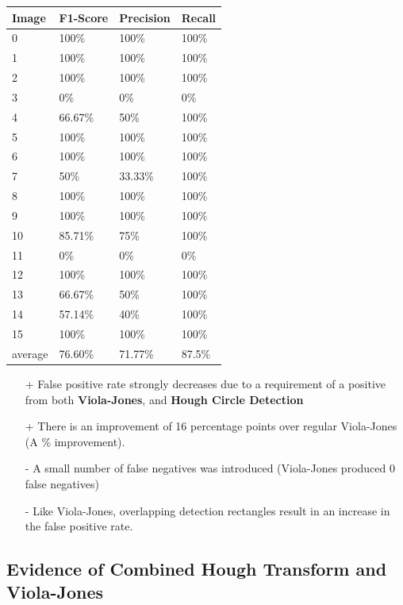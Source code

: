 \documentclass[conference]{IEEEtran}
\begin{document}
\begin{center}
	\begin{tabular}{| l | l | l | l |}
		\hline
		Image & F1-Score & Precision & Recall \\ \hline
		0 & 100\% & 100\% & 100\% \\ \hline
		1 & 100\% & 100\% & 100\% \\ \hline
		2 & 100\% & 100\% & 100\% \\ \hline
		3 &  0\% & 0\% & 0\% \\ \hline
		4 & 66.67\% & 50\% & 100\% \\ \hline
		5 & 100\% & 100\% & 100\% \\ \hline
		6 & 100\%  & 100\% & 100\% \\ \hline
		7 & 50\% & 33.33\% & 100\%\\ \hline
		8 & 100\% & 100\% & 100\% \\ \hline
		9 & 100\% & 100\% & 100\% \\ \hline
		10 & 85.71\% & 75\% & 100\% \\ \hline
		11 & 0\% & 0\% & 0\% \\ \hline
		12 & 100\% & 100\% & 100\% \\ \hline
		13 & 66.67\% & 50\% & 100\% \\ \hline
		14 & 57.14\% & 40\% & 100\% \\ \hline
		15 & 100\% & 100\% & 100\%\\ \hline
		average & 76.60\% & 71.77\% & 87.5\% \\ \hline
	\end{tabular}
\end{center}

\begin{itemize}
	\item[+] False positive rate strongly decreases due to a requirement of a positive from both \textbf{Viola-Jones}, and \textbf{Hough Circle Detection}
	\item[+] There is an improvement of 16 percentage points over regular Viola-Jones (A \% improvement).
	\item[-] A small number of false negatives was introduced (Viola-Jones produced 0 false negatives)
	\item[-] Like Viola-Jones, overlapping detection rectangles result in an increase in the false positive rate.
\end{itemize}

\subsection{Evidence of Combined Hough Transform and Viola-Jones}
\end{document}
